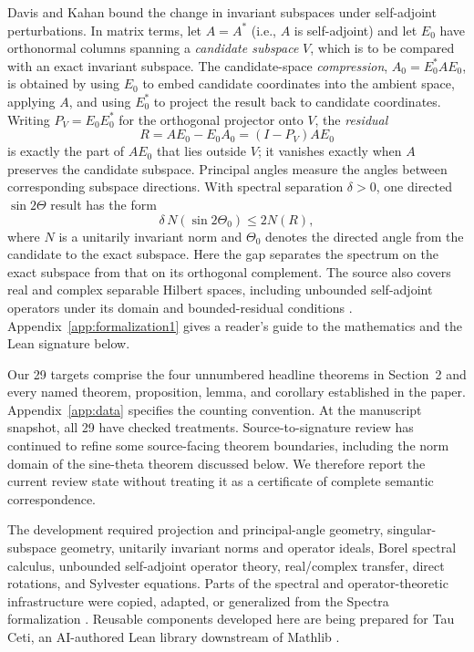 \documentclass{article}
\begin{document}
Davis and Kahan bound the change in invariant subspaces under self-adjoint
perturbations.  In matrix terms, let $A=A^*$ (i.e., $A$ is self-adjoint) and let
$E_0$ have orthonormal columns spanning a \emph{candidate subspace} $V$, which
is to be compared with an exact invariant subspace.  The candidate-space
\emph{compression}, $A_0=E_0^*AE_0$, is obtained by using $E_0$ to embed
candidate coordinates into the ambient space, applying $A$, and using $E_0^*$
to project the result back to candidate coordinates.  Writing $P_V=E_0E_0^*$ for the orthogonal projector
onto $V$, the \emph{residual}
\[
  R=AE_0-E_0A_0=(I-P_V)AE_0
\]
is exactly the part of $AE_0$ that lies outside $V$; it vanishes exactly when
$A$ preserves the candidate subspace.  Principal angles measure the angles
between corresponding subspace directions.  With spectral separation $\delta>0$,
one directed
$\sin 2\Theta$ result has the form
\begin{equation}
  \delta\,N(\sin 2\Theta_0) \le 2N(R),
  \label{eq:sin2theta}
\end{equation}
where $N$ is a unitarily invariant norm and $\Theta_0$ denotes the directed
angle from the candidate to the exact subspace.  Here the gap separates the
spectrum on the exact subspace from that on its orthogonal complement.
The source also covers real and complex separable Hilbert spaces, including
unbounded self-adjoint operators under its domain and bounded-residual
conditions \citep{davis1970rotation}.  Appendix~\ref{app:formalization1} gives a
reader's guide to the mathematics and the Lean signature below.

Our 29 targets comprise the four unnumbered headline theorems in Section~2 and
every named theorem, proposition, lemma, and corollary established in the paper.
Appendix~\ref{app:data} specifies the counting convention.  At the manuscript
snapshot, all 29 have checked treatments.  Source-to-signature review has
continued to refine some source-facing theorem boundaries, including the norm
domain of the sine-theta theorem discussed below.  We therefore report the
current review state without treating it as a certificate of complete semantic
correspondence.

The development required projection and principal-angle geometry,
singular-subspace geometry, unitarily invariant norms and operator ideals,
Borel spectral calculus, unbounded self-adjoint operator theory, real/complex
transfer, direct rotations, and Sylvester equations.  Parts of the spectral and
operator-theoretic infrastructure were copied, adapted, or generalized from the
Spectra formalization \citep{bornemann2026spectra}.  Reusable components developed
here are being prepared for Tau Ceti, an AI-authored Lean library downstream of
Mathlib \citep{tauceti2026}.
\end{document}
